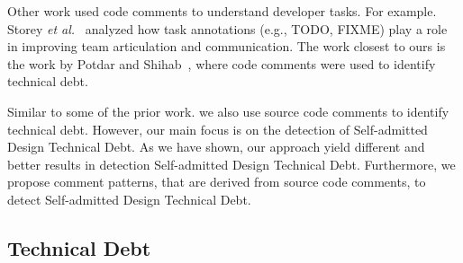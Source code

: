 \documentclass[conference]{IEEEtran}
\newcommand{\SADTD}{Self-admitted Design Technical Debt\xspace}
\begin{document}
Other work used code comments to understand developer tasks. For example. Storey \textit{et al.}~\cite{Storey2008ICSE} analyzed how task annotations (e.g., TODO, FIXME) play a role in improving team articulation and communication. The work closest to ours is the work by Potdar and Shihab~\cite{Potdar2014ICSME}, where code comments were used to identify technical debt. 

Similar to some of the prior work. we also use source code comments to identify technical debt. However, our main focus is on the detection of \SADTD. As we have shown, our approach yield different and better results in detection \SADTD. Furthermore, we propose comment patterns, that are derived from source code comments, to detect \SADTD.


\subsection{Technical Debt}
\end{document}
